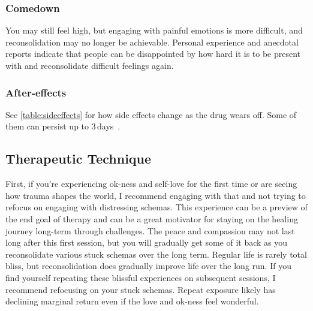 \documentclass[11pt,oneside]{book}
\let\cite\parencite
\begin{document}
\subsubsection*{Comedown} You may still feel high, but engaging with painful emotions is more difficult, and reconsolidation may no longer be achievable. Personal experience and anecdotal reports indicate that people can be disappointed by how hard it is to be present with and reconsolidate difficult feelings again.

\subsubsection*{After-effects}
See \cref{table:sideeffects} for how side effects change as the drug wears off. Some of them can persist up to 3\,days~\cite{liechtiGender}.

\subsection*{Therapeutic Technique}
First, if you're experiencing ok-ness and self-love for the first time or are seeing how trauma shapes the world, I recommend engaging with that and not trying to refocus on engaging with distressing schemas. This experience can be a preview of the end goal of therapy and can be a great motivator for staying on the healing journey long-term through challenges. The peace and compassion may not last long after this first session, but you will gradually get some of it back as you reconsolidate various stuck schemas over the long term. Regular life is rarely total bliss, but reconsolidation does gradually improve life over the long run. If you find yourself repeating these blissful experiences on subsequent sessions, I recommend refocusing on your stuck schemas. Repeat exposure likely has declining marginal return even if the love and ok-ness feel wonderful.
\end{document}
